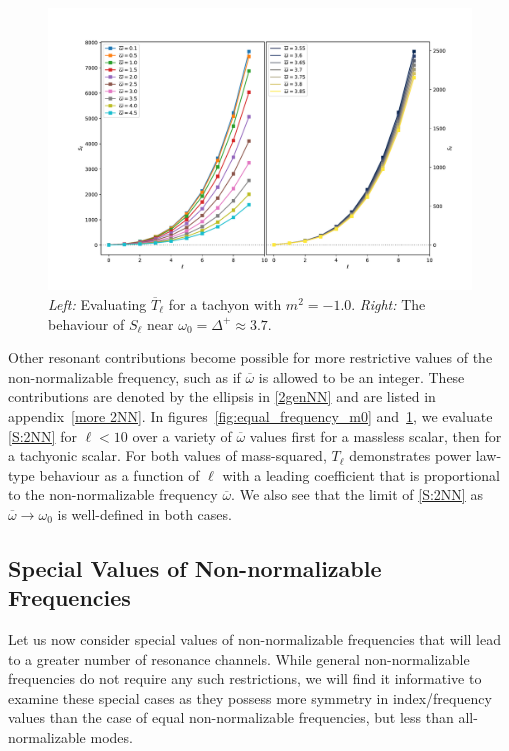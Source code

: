 \documentclass[letterpaper,11pt]{article}
\newcommand{\ob}{\overline{\omega}}
\begin{document}
\begin{figure}[h]
\centering
\includegraphics[width=\textwidth]{./figures/NN_equalfreq_sourceterms_m-1_0+zoom}
\caption{{\it Left:} Evaluating $\overline{T}_{\ell}$ for a tachyon with $m^2 = -1.0$. {\it Right:} The behaviour of $S_\ell$ near $\omega_0 = \Delta^+ \approx  3.7$.}
\label{fig:equal_frequency_m-1_0}
\end{figure}

Other resonant contributions become possible for more restrictive values of the non-normalizable frequency, such as if $\ob$ is allowed to be an integer. These contributions are denoted by the ellipsis in \eqref{2genNN} and are listed in appendix~\ref{more 2NN}. In figures~\ref{fig:equal_frequency_m0} and~\ref{fig:equal_frequency_m-1_0}, we evaluate \eqref{S:2NN} for $\ell < 10$ over a variety of $\ob$ values first for a massless scalar, then for a tachyonic scalar. For both values of mass-squared, $T_\ell$ demonstrates power law-type behaviour as a function of $\ell$ with a leading coefficient that is proportional to the non-normalizable frequency $\ob$. We also see that the limit of \eqref{S:2NN} as $\ob \to \omega_0$ is well-defined in both cases.

\subsection{Special Values of Non-normalizable Frequencies}

Let us now consider special values of non-normalizable frequencies that will lead to a greater number of resonance channels. While general non-normalizable frequencies do not require any such restrictions, we will find it informative to examine these special cases as they possess more symmetry in index/frequency values than the case of equal non-normalizable frequencies, but less than all-normalizable modes. 
\end{document}
